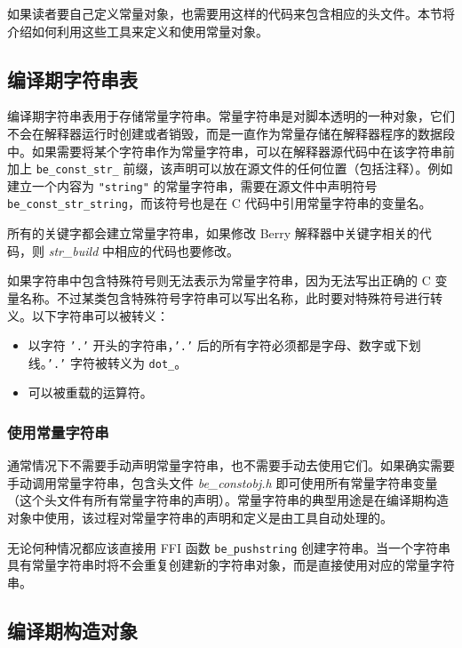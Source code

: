 如果读者要自己定义常量对象，也需要用这样的代码来包含相应的头文件。本节将介绍如何利用这些工具来定义和使用常量对象。

\subsection{编译期字符串表}

编译期字符串表用于存储常量字符串。常量字符串是对脚本透明的一种对象，它们不会在解释器运行时创建或者销毁，而是一直作为常量存储在解释器程序的数据段中。如果需要将某个字符串作为常量字符串，可以在解释器源代码中在该字符串前加上 \texttt{be\_const\_str\_} 前缀，该声明可以放在源文件的任何位置（包括注释）。例如建立一个内容为 \texttt{"string"} 的常量字符串，需要在源文件中声明符号 \texttt{be\_const\_str\_string}，而该符号也是在 C 代码中引用常量字符串的变量名。

所有的关键字都会建立常量字符串，如果修改 Berry 解释器中关键字相关的代码，则 \textsl{str\_build} 中相应的代码也要修改。

如果字符串中包含特殊符号则无法表示为常量字符串，因为无法写出正确的 C 变量名称。不过某类包含特殊符号字符串可以写出名称，此时要对特殊符号进行转义。以下字符串可以被转义：

\begin{itemize}
    \item 以字符 \texttt{'.'} 开头的字符串，\texttt{'.'} 后的所有字符必须都是字母、数字或下划线。\texttt{'.'} 字符被转义为 \texttt{dot\_}。
    \item 可以被重载的运算符。
\end{itemize}

\subsubsection{使用常量字符串}

通常情况下不需要手动声明常量字符串，也不需要手动去使用它们。如果确实需要手动调用常量字符串，包含头文件 \textsl{be\_constobj.h} 即可使用所有常量字符串变量（这个头文件有所有常量字符串的声明）。常量字符串的典型用途是在编译期构造对象中使用，该过程对常量字符串的声明和定义是由工具自动处理的。

无论何种情况都应该直接用 FFI 函数 \texttt{be\_pushstring} 创建字符串。当一个字符串具有常量字符串时将不会重复创建新的字符串对象，而是直接使用对应的常量字符串。

\subsection{编译期构造对象}

